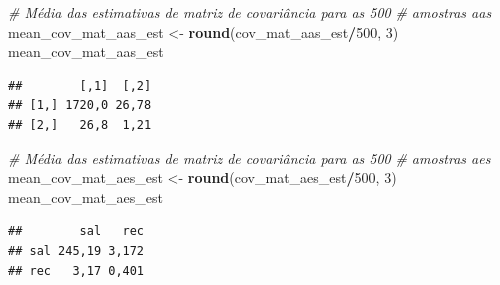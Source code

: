\documentclass[]{book}
\newenvironment{Shaded}{\begin{snugshade}}{\end{snugshade}}
\newcommand{\KeywordTok}[1]{\textcolor[rgb]{0.13,0.29,0.53}{\textbf{#1}}}
\newcommand{\DecValTok}[1]{\textcolor[rgb]{0.00,0.00,0.81}{#1}}
\newcommand{\StringTok}[1]{\textcolor[rgb]{0.31,0.60,0.02}{#1}}
\newcommand{\CommentTok}[1]{\textcolor[rgb]{0.56,0.35,0.01}{\textit{#1}}}
\newcommand{\OperatorTok}[1]{\textcolor[rgb]{0.81,0.36,0.00}{\textbf{#1}}}
\newcommand{\NormalTok}[1]{#1}
\theoremstyle{definition}
\theoremstyle{definition}
\theoremstyle{definition}
\theoremstyle{remark}
\begin{document}
\begin{Shaded}
\begin{Highlighting}[]
\CommentTok{# Média das estimativas de matriz de covariância para as 500}
\CommentTok{# amostras aas}
\NormalTok{mean_cov_mat_aas_est <-}\StringTok{ }\KeywordTok{round}\NormalTok{(cov_mat_aas_est}\OperatorTok{/}\DecValTok{500}\NormalTok{, }\DecValTok{3}\NormalTok{)}
\NormalTok{mean_cov_mat_aas_est}
\end{Highlighting}
\end{Shaded}

\begin{verbatim}
##        [,1]  [,2]
## [1,] 1720,0 26,78
## [2,]   26,8  1,21
\end{verbatim}

\begin{Shaded}
\begin{Highlighting}[]
\CommentTok{# Média das estimativas de matriz de covariância para as 500}
\CommentTok{# amostras aes}
\NormalTok{mean_cov_mat_aes_est <-}\StringTok{ }\KeywordTok{round}\NormalTok{(cov_mat_aes_est}\OperatorTok{/}\DecValTok{500}\NormalTok{, }\DecValTok{3}\NormalTok{)}
\NormalTok{mean_cov_mat_aes_est}
\end{Highlighting}
\end{Shaded}

\begin{verbatim}
##        sal   rec
## sal 245,19 3,172
## rec   3,17 0,401
\end{verbatim}
\end{document}
